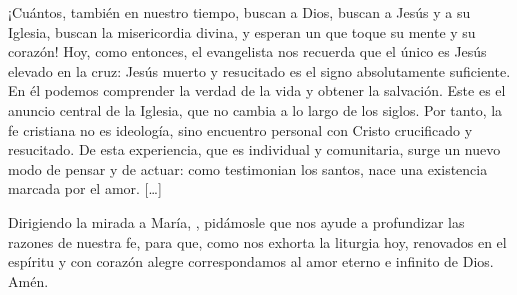 \begin{body}
¡Cuántos, también en nuestro tiempo, buscan a Dios, buscan a Jesús y a su Iglesia, buscan la misericordia divina, y esperan un  que toque su mente y su corazón! Hoy, como entonces, el evangelista nos recuerda que el único  es Jesús elevado en la cruz: Jesús muerto y resucitado es el signo absolutamente suficiente. En él podemos comprender la verdad de la vida y obtener la salvación. Este es el anuncio central de la Iglesia, que no cambia a lo largo de los siglos. Por tanto, la fe cristiana no es ideología, sino encuentro personal con Cristo crucificado y resucitado. De esta experiencia, que es individual y comunitaria, surge un nuevo modo de pensar y de actuar: como testimonian los santos, nace una existencia marcada por el amor. [\ldots]

Dirigiendo la mirada a María, , pidámosle que nos ayude a profundizar las razones de nuestra fe, para que, como nos exhorta la liturgia hoy, renovados en el espíritu y con corazón alegre correspondamos al amor eterno e infinito de Dios. Amén.
\end{body}

\label{b2-03-04-2006H}

